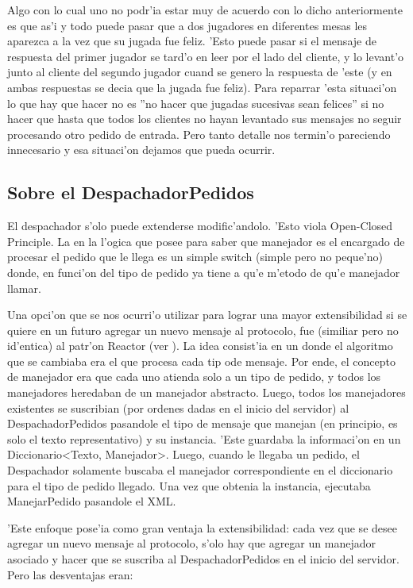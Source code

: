 Algo con lo cual uno no podr'ia estar muy de acuerdo con lo dicho anteriormente es que as'i y todo puede pasar que a dos jugadores en diferentes mesas les aparezca a la vez que su jugada fue feliz. 'Esto puede pasar si el mensaje de respuesta del primer jugador se tard'o en leer por el lado del cliente, y lo levant'o junto al cliente del segundo jugador cuand se genero la respuesta de 'este (y en ambas respuestas se decia que la jugada fue feliz). Para reparrar 'esta situaci'on lo que hay que hacer no es ''no hacer que jugadas sucesivas sean felices'' si no hacer que hasta que todos los clientes no hayan levantado sus mensajes no seguir procesando otro pedido de entrada. Pero tanto detalle nos termin'o pareciendo innecesario y esa situaci'on dejamos que pueda ocurrir.


\subsection{Sobre el DespachadorPedidos}
El despachador s'olo puede extenderse modific'andolo. 'Esto viola Open-Closed Principle. La  en la l'ogica que posee para saber que manejador es el encargado de procesar el pedido que le llega es un simple switch (simple pero no peque'no) donde, en funci'on del tipo de pedido ya tiene  a qu'e m'etodo de qu'e manejador llamar.

Una opci'on que se nos ocurri'o utilizar para lograr una mayor extensibilidad si se quiere en un futuro agregar un nuevo mensaje al protocolo, fue (similiar pero no id'entica) al patr'on Reactor (ver \cite{Reactor}). La idea consist'ia en un  donde el algoritmo que se cambiaba era el que procesa cada tip ode mensaje. Por ende, el concepto de manejador era que cada uno atienda solo a un tipo de pedido, y todos los manejadores heredaban de un manejador abstracto. Luego, todos los manejadores existentes se suscribian (por ordenes dadas en el inicio del servidor) al DespachadorPedidos pasandole el tipo de mensaje que manejan (en principio, es solo el texto representativo) y su instancia. 'Este guardaba la informaci'on en un Diccionario<Texto, Manejador>. Luego, cuando le llegaba un pedido, el Despachador solamente buscaba el manejador correspondiente en el diccionario para el tipo de pedido llegado. Una vez que obtenia la instancia, ejecutaba ManejarPedido pasandole el XML. 

'Este enfoque pose'ia como gran ventaja la extensibilidad: cada vez que se desee agregar un nuevo mensaje al protocolo, s'olo hay que agregar un manejador asociado y hacer que se suscriba al DespachadorPedidos en el inicio del servidor. Pero las desventajas eran:


